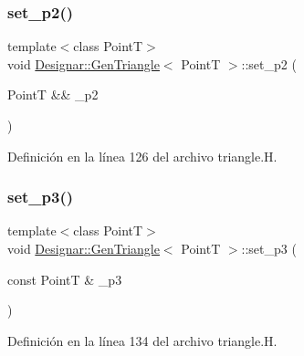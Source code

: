 \mbox{\label{class_designar_1_1_gen_triangle_afe141eabfa887a63fcdff0b084a1962e}} 
\subsubsection{\texorpdfstring{set\+\_\+p2()}{set\_p2()}\hspace{0.1cm}{\footnotesize\ttfamily [2/2]}}
{\footnotesize\ttfamily template$<$class PointT$>$ \\
void \hyperlink{class_designar_1_1_gen_triangle}{Designar\+::\+Gen\+Triangle}$<$ PointT $>$\+::set\+\_\+p2 (\begin{DoxyParamCaption}\item[{PointT \&\&}]{\+\_\+p2 }\end{DoxyParamCaption})\hspace{0.3cm}{\ttfamily [inline]}}



Definición en la línea 126 del archivo triangle.\+H.

\mbox{\label{class_designar_1_1_gen_triangle_a2bb761ccf1029ca9118b9ae2fe924eab}} 
\subsubsection{\texorpdfstring{set\+\_\+p3()}{set\_p3()}\hspace{0.1cm}{\footnotesize\ttfamily [1/2]}}
{\footnotesize\ttfamily template$<$class PointT$>$ \\
void \hyperlink{class_designar_1_1_gen_triangle}{Designar\+::\+Gen\+Triangle}$<$ PointT $>$\+::set\+\_\+p3 (\begin{DoxyParamCaption}\item[{const PointT \&}]{\+\_\+p3 }\end{DoxyParamCaption})\hspace{0.3cm}{\ttfamily [inline]}}



Definición en la línea 134 del archivo triangle.\+H.


